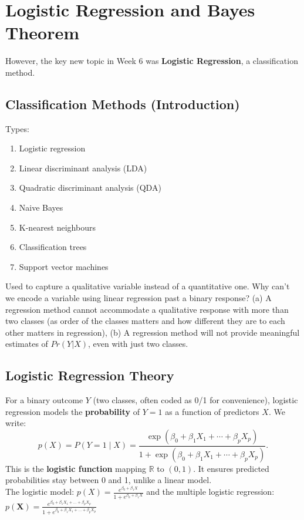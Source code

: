 \documentclass[11pt]{article}
\begin{document}
\newpage
\section{Logistic Regression and Bayes Theorem}

However, the key new topic in Week 6 was \textbf{Logistic Regression}, a classification method.

\subsection{Classification Methods (Introduction)}
Types:
\begin{enumerate}
    \item Logistic regression
    \item Linear discriminant analysis (LDA)
    \item Quadratic discriminant analysis (QDA)
    \item Naive Bayes
    \item K-nearest neighbours
    \item Classification trees
    \item Support vector machines
\end{enumerate}
\vspace{1em} \noindent Used to capture a qualitative variable instead of a quantitative one. Why can't we encode a variable using linear regression past a binary response? (a) A regression method cannot accommodate a qualitative response with more than two classes (as order of the classes matters and how different they are to each other matters in regression), (b) A regression method will not provide meaningful estimates of $Pr(Y|X)$, even with just two classes.


\subsection{Logistic Regression Theory}
For a binary outcome $Y$ (two classes, often coded as 0/1 for convenience), logistic regression models the \textbf{probability} of $Y=1$ as a function of predictors $X$. We write:
\[ p(X) = P(Y=1 \mid X) = \frac{\exp(\beta_0 + \beta_1 X_1 + \cdots + \beta_p X_p)}{1 + \exp(\beta_0 + \beta_1 X_1 + \cdots + \beta_p X_p)}. \]
This is the \textbf{logistic function} mapping $\mathbb{R}$ to $(0,1)$. It ensures predicted probabilities stay between 0 and 1, unlike a linear model. \\

\noindent The logistic model: $p(X) = \frac{e^{\beta_{0}  + \beta_{1}X}}{1 + e^{\beta_{0} + \beta_{1}X}}$ and the multiple logistic regression: $p(\boldsymbol{X}) = \frac{e^{\beta_{0} + \beta_{1}X_{1} + ... + \beta_{p}X_{p}}}{1 + e^{\beta_{0} + \beta_{1}X_{1} + ... + \beta_{p}X_{p}}}$ \\
\end{document}
